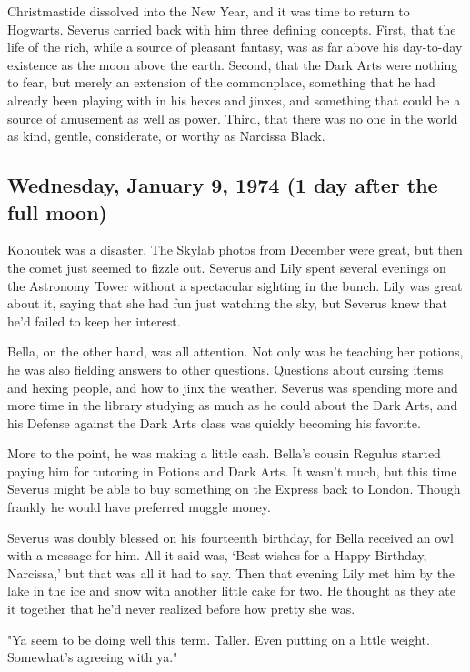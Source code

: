 Christmastide dissolved into the New Year, and it was time to return to Hogwarts. Severus carried back with him three defining concepts. First, that the life of the rich, while a source of pleasant fantasy, was as far above his day-to-day existence as the moon above the earth. Second, that the Dark Arts were nothing to fear, but merely an extension of the commonplace, something that he had already been playing with in his hexes and jinxes, and something that could be a source of amusement as well as power. Third, that there was no one in the world as kind, gentle, considerate, or worthy as Narcissa Black.

\subsection{Wednesday, January 9, 1974 (1 day after the full moon)}

Kohoutek was a disaster. The Skylab photos from December were great, but then the comet just seemed to fizzle out. Severus and Lily spent several evenings on the Astronomy Tower without a spectacular sighting in the bunch. Lily was great about it, saying that she had fun just watching the sky, but Severus knew that he'd failed to keep her interest.

Bella, on the other hand, was all attention. Not only was he teaching her potions, he was also fielding answers to other questions. Questions about cursing items and hexing people, and how to jinx the weather. Severus was spending more and more time in the library studying as much as he could about the Dark Arts, and his Defense against the Dark Arts class was quickly becoming his favorite.

More to the point, he was making a little cash. Bella's cousin Regulus started paying him for tutoring in Potions and Dark Arts. It wasn't much, but this time Severus might be able to buy something on the Express back to London. Though frankly he would have preferred muggle money.

Severus was doubly blessed on his fourteenth birthday, for Bella received an owl with a message for him. All it said was, `Best wishes for a Happy Birthday, Narcissa,' but that was all it had to say. Then that evening Lily met him by the lake in the ice and snow with another little cake for two. He thought as they ate it together that he'd never realized before how pretty she was.

"Ya seem to be doing well this term. Taller. Even putting on a little weight. Somewhat's agreeing with ya."

